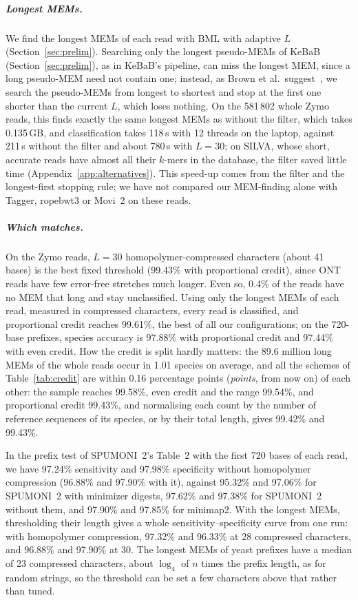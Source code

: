 \subparagraph*{Longest MEMs.}
We find the longest MEMs of each read with BML with adaptive $L$ (Section~\ref{sec:prelim}).
Searching only the longest pseudo-MEMs of KeBaB (Section~\ref{sec:prelim}), as in KeBaB's pipeline, can miss the longest MEM, since a long pseudo-MEM need not contain one; instead, as Brown et al.\ suggest~\cite{BrownEtAl2025KeBaB}, we search the pseudo-MEMs from longest to shortest and stop at the first one shorter than the current $L$, which loses nothing. %
On the 581\,802 whole Zymo reads, this finds exactly the same longest MEMs as without the filter, which takes 0.135\,GB, and classification takes 118\,s with 12 threads on the laptop, against 211\,s without the filter and about 780\,s with $L = 30$; on SILVA, whose short, accurate reads have almost all their $k$-mers in the database, the filter saved little time (Appendix~\ref{app:alternatives}).
This speed-up comes from the filter and the longest-first stopping rule; we have not compared our MEM-finding alone with Tagger, ropebwt3 or Movi~2 on these reads.

\subparagraph*{Which matches.}
\label{sec:zymo-accuracy}
On the Zymo reads, $L = 30$ homopolymer-compressed characters (about 41 bases) is the best fixed threshold (99.43\% with proportional credit), since ONT reads have few error-free stretches much longer.
Even so, 0.4\% of the reads have no MEM that long and stay unclassified.
Using only the longest MEMs of each read, measured in compressed characters, every read is classified, and proportional credit reaches 99.61\%, the best of all our configurations; on the 720-base prefixes, species accuracy is 97.88\% with proportional credit and 97.44\% with even credit.
How the credit is split hardly matters: the 89.6 million long MEMs of the whole reads occur in 1.01 species on average, and all the schemes of Table~\ref{tab:credit} are within 0.16 percentage points (\emph{points}, from now on) of each other: the sample reaches 99.58\%, even credit and the range 99.54\%, and proportional credit 99.43\%, and normalising each count by the number of reference sequences of its species, or by their total length, gives 99.42\% and 99.43\%.

In the prefix test of SPUMONI~2's Table~2 with the first 720 bases of each read, we have 97.24\% sensitivity and 97.98\% specificity without homopolymer compression (96.88\% and 97.90\% with it), against 95.32\% and 97.06\% for SPUMONI~2 with minimizer digests, 97.62\% and 97.38\% for SPUMONI~2 without them, and 97.90\% and 97.85\% for minimap2.
With the longest MEMs, thresholding their length gives a whole sensitivity--specificity curve from one run: with homopolymer compression, 97.32\% and 96.33\% at 28 compressed characters, and 96.88\% and 97.90\% at 30.
The longest MEMs of yeast prefixes have a median of 23 compressed characters, about $\log_4$ of $n$ times the prefix length, as for random strings, so the threshold can be set a few characters above that rather than tuned.

